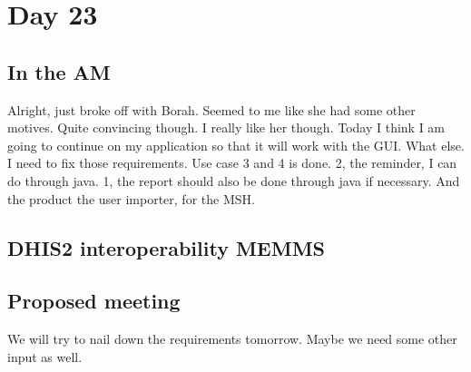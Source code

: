\section{Day 23}
\subsection{In the AM}
Alright, just broke off with Borah. Seemed to me like she had some other motives.
Quite convincing though.
I really like her though. 
Today I think I am going to continue on my application so that it will work with the GUI.
What else. 
I need to fix those requirements. Use case 3 and 4 is done.
2, the reminder, I can do through java.
1, the report should also be done through java if necessary.
And the product the user importer, for the MSH.

\subsection{DHIS2 interoperability MEMMS}

\subsection{Proposed meeting}
We will try to nail down the requirements tomorrow.
Maybe we need some other input as well.